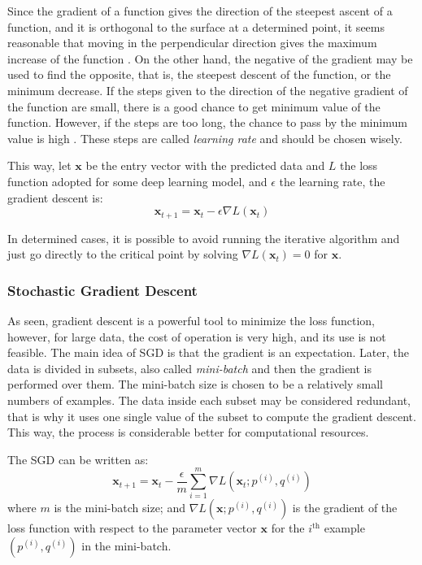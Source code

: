 Since the gradient of a function gives the direction of the steepest ascent of a function, and it is orthogonal to the surface at a determined point, it seems reasonable that moving in the perpendicular direction gives the maximum increase of the function \cite{stewart2016}.
On the other hand, the negative of the gradient may be used to find the opposite, that is, the steepest descent of the function, or the minimum decrease.
If the steps given to the direction of the negative gradient of the function are small, there is a good chance to get minimum value of the function.
However, if the steps are too long, the chance to pass by the minimum value is high \cite{nielsen2015}.
These steps are called \emph{learning rate} and should be chosen wisely.

This way, let \(\mathbf{x}\) be the entry vector with the predicted data and \(L\) the loss function adopted for some deep learning model, and \(\epsilon\) the learning rate, the gradient descent is:
%
\begin{equation}
    \mathbf{x}_{t+1} = \mathbf{x}_t - \epsilon \nabla L(\mathbf{x}_t)
\end{equation}

In determined cases, it is possible to avoid running the iterative algorithm and just go directly to the critical point by solving \(\nabla L(\mathbf{x}_t) = 0\) for \(\mathbf{x}\).

\subsubsection*{Stochastic Gradient Descent}

As seen, gradient descent is a powerful tool to minimize the loss function, however, for large data, the cost of operation is very high, and its use is not feasible. 
The main idea of SGD is that the gradient is an expectation.
Later, the data is divided in subsets, also called \emph{mini-batch} and then the gradient is performed over them.
The mini-batch size is chosen to be a relatively small numbers of examples.
The data inside each subset may be considered redundant, that is why it uses one single value of the subset to compute the gradient descent.
This way, the process is considerable better for computational resources.

The SGD can be written as:
%
\begin{equation}
    \mathbf{x}_{t+1} = \mathbf{x}_t - \frac{\epsilon}{m} \sum_{i=1}^m \nabla L(\mathbf{x}_t; p^{(i)},q^{(i)})
\end{equation}
%
where \(m\)  is the mini-batch size; and \(\nabla L(\mathbf{x}; p^{(i)}, q^{(i)})\) is the gradient of the loss function with respect to the parameter vector \(\mathbf{x}\) for the \(i^{\text{th}}\) example \((p^{(i)}, q^{(i)})\) in the mini-batch.

